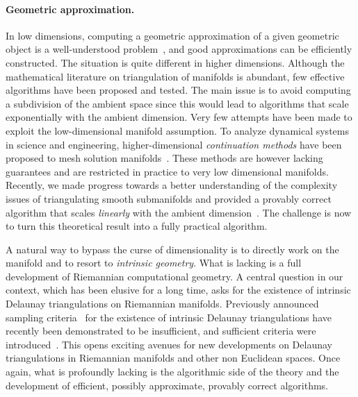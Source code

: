 \paragraph{Geometric approximation.}
In low dimensions, computing a geometric approximation of a given geometric
object is a well-understood problem~\cite{geometrica-ecg-book,dey-csr-2007}, and good approximations can be
efficiently constructed.
The situation is quite different in higher dimensions.  Although the
mathematical literature on triangulation of manifolds is abundant, few
effective algorithms have been proposed and tested.  The main issue is
to avoid computing a subdivision of the ambient space since this would lead to algorithms that scale exponentially with the ambient dimension. Very few attempts have been made to exploit the  low-dimensional manifold assumption.
To analyze {dynamical systems} in science and engineering, higher-dimensional {\em continuation methods} have been proposed to mesh solution manifolds~\cite{mh-mpc-2002}. These methods are however lacking guarantees and are restricted in practice to very low dimensional manifolds. 
Recently, we made progress towards a better understanding of the complexity issues of triangulating smooth submanifolds and provided a provably correct algorithm that scales {\em linearly} with the ambient dimension~\cite{boissonnat2010meshing}. 
The challenge is now to turn this theoretical result into a fully practical algorithm.

A natural way to bypass the curse of dimensionality is to directly
work on the manifold and to resort to {\em intrinsic geometry}. What
is lacking is a full development of Riemannian computational
geometry. A central question in our context, which has been elusive
for a long time, asks for the existence of intrinsic Delaunay triangulations on
Riemannian manifolds. Previously announced sampling
criteria~\cite{leibon2000} for the existence of intrinsic Delaunay
triangulations have recently been demonstrated to be insufficient, and
sufficient criteria were introduced~\cite{boissonnat2012stab}. This opens exciting avenues for new developments on Delaunay triangulations in Riemannian manifolds and other non Euclidean spaces. Once again, what is profoundly lacking is the algorithmic side of the theory and the development of efficient, possibly approximate, provably correct algorithms.  %


